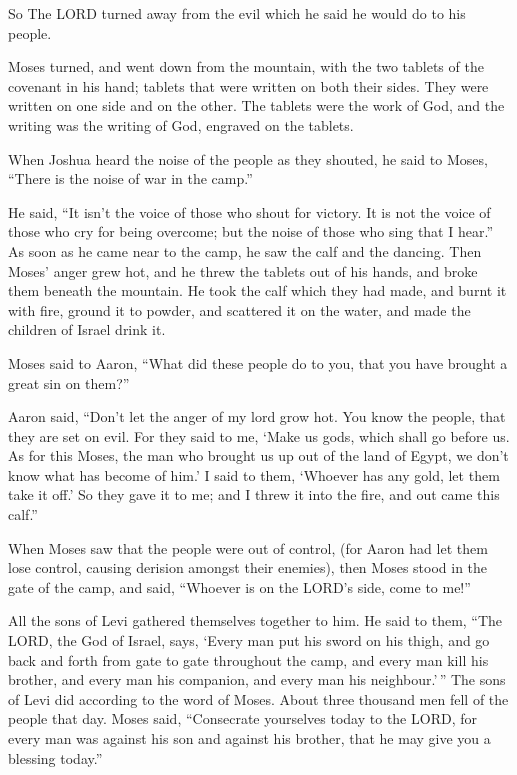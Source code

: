  So The LORD turned away from the evil which he said he
would do to his people.

 Moses turned, and went down from the mountain, with the
two tablets of the covenant in his hand; tablets that were written on
both their sides. They were written on one side and on the other.
 The tablets were the work of God, and the writing was
the writing of God, engraved on the tablets.

 When Joshua heard the noise of the people as they
shouted, he said to Moses, ``There is the noise of war in the camp.''

 He said, ``It isn't the voice of those who shout for
victory. It is not the voice of those who cry for being overcome; but
the noise of those who sing that I hear.''  As soon as he
came near to the camp, he saw the calf and the dancing. Then Moses'
anger grew hot, and he threw the tablets out of his hands, and broke
them beneath the mountain.  He took the calf which they
had made, and burnt it with fire, ground it to powder, and scattered it
on the water, and made the children of Israel drink it.

 Moses said to Aaron, ``What did these people do to you,
that you have brought a great sin on them?''

 Aaron said, ``Don't let the anger of my lord grow hot.
You know the people, that they are set on evil.  For they
said to me, `Make us gods, which shall go before us. As for this Moses,
the man who brought us up out of the land of Egypt, we don't know what
has become of him.'  I said to them, `Whoever has any
gold, let them take it off.' So they gave it to me; and I threw it into
the fire, and out came this calf.''

 When Moses saw that the people were out of control, (for
Aaron had let them lose control, causing derision amongst their
enemies),  then Moses stood in the gate of the camp, and
said, ``Whoever is on the LORD's side, come to me!''

All the sons of Levi gathered themselves together to him.
 He said to them, ``The LORD, the God of Israel, says,
`Every man put his sword on his thigh, and go back and forth from gate
to gate throughout the camp, and every man kill his brother, and every
man his companion, and every man his neighbour.'\,''  The
sons of Levi did according to the word of Moses. About three thousand
men fell of the people that day.  Moses said,
``Consecrate yourselves today to the LORD, for every man was against his
son and against his brother, that he may give you a blessing today.''


